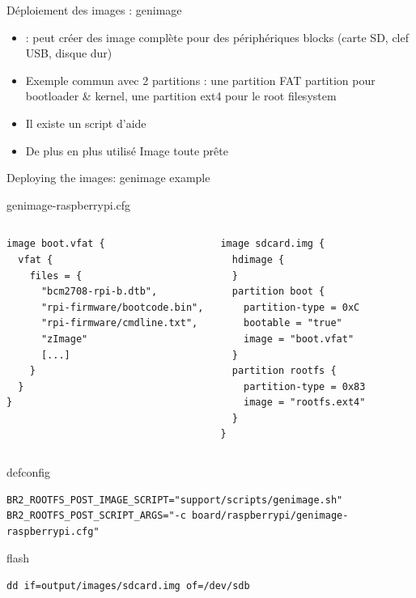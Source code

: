 \documentclass[aspectratio=169,obeyspaces,spaces,hyphens,dvipsnames]{beamer}
\begin{document}
\begin{frame}{Déploiement des images : genimage}
  \begin{itemize}
  \item {} : peut créer des image complète pour des périphériques
    blocks (carte SD, clef USB, disque dur)
  \item Exemple commun avec 2 partitions : une partition FAT partition
    pour bootloader \& kernel, une partition ext4 pour le root filesystem
  \item Il existe un script d'aide 
  \item De plus en plus utilisé \MVRightarrow Image toute prête
  \end{itemize}
\end{frame}

\begin{frame}[fragile]{Deploying the images: genimage example}
\begin{block}{genimage-raspberrypi.cfg}
\begin{columns}
{\tiny
  \begin{verbatim}
image boot.vfat {
  vfat {
    files = {
      "bcm2708-rpi-b.dtb",
      "rpi-firmware/bootcode.bin",
      "rpi-firmware/cmdline.txt",
      "zImage"
      [...]
    }
  }
}
\end{verbatim}
}
{\tiny
\begin{verbatim}
image sdcard.img {
  hdimage {
  }
  partition boot {
    partition-type = 0xC
    bootable = "true"
    image = "boot.vfat"
  }
  partition rootfs {
    partition-type = 0x83
    image = "rootfs.ext4"
  }
}
 \end{verbatim}
}
\end{columns}
\end{block}
\begin{block}{defconfig}
{\tiny
  \begin{verbatim}
BR2_ROOTFS_POST_IMAGE_SCRIPT="support/scripts/genimage.sh"
BR2_ROOTFS_POST_SCRIPT_ARGS="-c board/raspberrypi/genimage-raspberrypi.cfg"
\end{verbatim}
}
\end{block}
\begin{block}{flash}
{\tiny
  \begin{verbatim}
dd if=output/images/sdcard.img of=/dev/sdb
\end{verbatim}
}
\end{block}
\end{frame}
\end{document}
